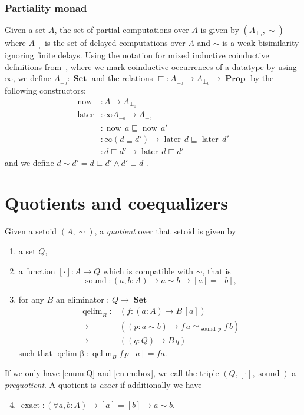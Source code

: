\documentclass[envcountsame]{llncs}
\providecommand{\class}[1]{[#1]}
\DeclareMathOperator{\Prop}{\mathbf{Prop}}
\DeclareMathOperator{\Set}{\mathbf{Set}}
\DeclareMathOperator{\sound}{sound}
\DeclareMathOperator{\qelimbeta}{qelim-\beta}
\DeclareMathOperator{\exact}{exact}
\DeclareMathOperator{\now}{now}
\DeclareMathOperator{\later}{later}
\DeclareMathOperator{\nowequal}{now_\sqsubseteq}
\DeclareMathOperator{\laterequal}{later_\sqsubseteq}
\DeclareMathOperator{\laterleft}{later_{left}}
\DeclareMathOperator{\qelim}{qelim}
\renewcommand{\equiv}{=}
\begin{document}
\subsubsection*{Partiality monad}
Given a set $A$, the set of partial computations over $A$ is given by $(A_{\bot_0},{\sim})$ where $A_{\bot_0}$ is the set of delayed computations over $A$  and $\sim$ is a weak bisimilarity ignoring finite delays. Using the notation for mixed inductive coinductive  definitions from~\cite{danielsson2010mpc}, where we mark coinductive occurrences of a datatype by using $\infty$, we define $A_{\bot_0} : \Set$ and the relations $\sqsubseteq:A_{\bot_0}\to A_{\bot_0} \to \Prop$ by the following constructors:
\begin{align*}
\now  &: A \to A_{\bot_0}\\
\later &: \infty A_{\bot_0} \to  A_{\bot_0}\\
\nowequal &: \now\, a \sqsubseteq \now\,a'\\
\laterequal &: \infty(d \sqsubseteq d') \to \later\,d \sqsubseteq \later\,d'\\
\laterleft &: d\sqsubseteq d' \to \later\,d \sqsubseteq d'
\end{align*}
and we define $d\sim d'= d\sqsubseteq d' \wedge d'\sqsubseteq d$ .

\section{Quotients and coequalizers}\label{sec:quotients}

\begin{definition}
\label{def:quotient}
Given a setoid $(A,\sim)$,  a \emph{quotient} over that setoid is given by

\begin{enumerate}
\item \label{enum:Q} a set $Q$,
\item \label{enum:box}a function $\class\cdot\colon A \to Q$ which is compatible with $\sim$,
that is \[\sound\colon (a,b : A) \to a\sim b \to [a] = [b],\]
\item \label{enum:elim}   for any $B$ an eliminator : $Q\to\Set$
 \begin{align*}
 \qelim_B\colon &(f\colon (a:A) \to B\,\class a) \\
        {\to}\, &((p:a\sim b) \to f\,a \simeq_{\sound\,p}f\,b)\\
        {\to}\, &((q:Q) \to B\,q)
 \end{align*}
such that $\qelimbeta\colon \qelim_B f \,p\,\class a\equiv f a$.

\end{enumerate}
If we only have \ref{enum:Q} and \ref{enum:box}, we call the triple $(Q,\class\cdot, \sound)$ a \emph{prequotient}.
A quotient is \emph{exact} if additionally
we have
\begin{enumerate}
\setcounter{enumi}{3}
\item $\exact :(\forall a,b : A) \to  \class a \equiv \class b \to a \sim b$.

\end{enumerate}
\end{definition}
\end{document}
